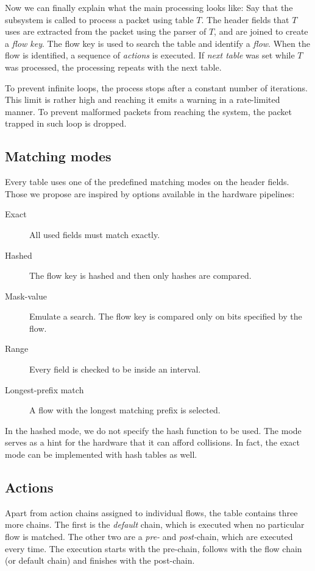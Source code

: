 Now we can finally explain what the main processing looks like: Say that
the subsystem is called to process a packet using table $T$. The header fields
that $T$ uses are extracted from the packet using the parser of $T$, and are
joined to create a \emph{flow key}. The flow key is used to search the table
and identify a \emph{flow}. When the flow is identified, a sequence of
\emph{actions} is executed. If \emph{next table} was set while $T$ was processed,
the processing repeats with the next table.

To prevent infinite loops, the process stops after a constant number of
iterations. This limit is rather high and reaching it emits a warning in
a rate-limited manner. To prevent malformed packets from reaching the system,
the packet trapped in such loop is dropped.

\subsection{Matching modes}

Every table uses one of the predefined matching modes on the header fields. Those we
propose are inspired by options available in the hardware pipelines:

\begin{description}
\item[Exact] All used fields must match exactly.
\item[Hashed] The flow key is hashed and then only hashes are compared.
\item[Mask-value] Emulate a  search. The flow key is compared only on
bits specified by the flow.
\item[Range] Every field is checked to be inside an interval.
\item[Longest-prefix match] A flow with the longest matching prefix is selected.
\end{description}

In the hashed mode, we do not specify the hash function to be used. The mode
serves as a hint for the hardware that it can afford collisions. In fact, the exact
mode can be implemented with hash tables as well.

\subsection{Actions}

Apart from action chains assigned to individual flows, the table contains three
more chains. The first is the \emph{default} chain, which is executed when no
particular flow is matched. The other two are a \emph{pre-} and
\emph{post-}chain, which are executed every time. The execution starts with the
pre-chain, follows with the flow chain (or default chain) and finishes with
the post-chain.

